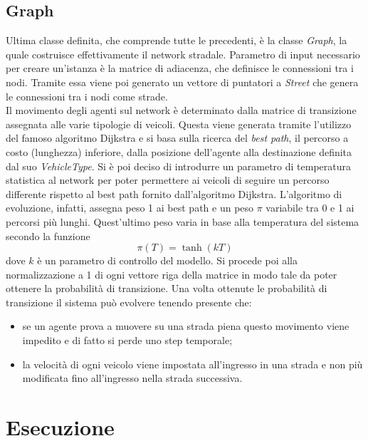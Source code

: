 \documentclass[../main.tex]{subfiles}un
\begin{document}
\subsection{Graph}
Ultima classe definita, che comprende tutte le precedenti, \`e la classe \emph{Graph}, la quale costruisce effettivamente il network stradale.
Parametro di input necessario per creare un'istanza \`e la matrice di adiacenza, che definisce le connessioni tra i nodi.
Tramite essa viene poi generato un vettore di puntatori a \emph{Street} che genera le connessioni tra i nodi come strade.\\
Il movimento degli agenti sul network \`e determinato dalla matrice di transizione assegnata alle varie tipologie di veicoli.
Questa viene generata tramite l'utilizzo del famoso algoritmo Dijkstra \cite{dijkstra} e si basa sulla ricerca del \emph{best path}, il percorso a costo (lunghezza) inferiore, dalla posizione dell'agente alla destinazione definita dal suo \emph{VehicleType}.
Si \`e poi deciso di introdurre un parametro di temperatura statistica al network per poter permettere ai veicoli di seguire un percorso differente rispetto al best path fornito dall'algoritmo Dijkstra.
L'algoritmo di evoluzione, infatti, assegna peso 1 ai best path e un peso $\pi$ variabile tra 0 e 1 ai percorsi più lunghi.
Quest'ultimo peso varia in base alla temperatura del sistema secondo la funzione
\begin{equation}
    \pi(T)=\tanh(kT)
\end{equation}
dove $k$ \`e un parametro di controllo del modello.
Si procede poi alla normalizzazione a 1 di ogni vettore riga della matrice in modo tale da poter ottenere la probabilità di transizione.
Una volta ottenute le probabilità di transizione il sistema può evolvere tenendo presente che:
\begin{itemize}
    \item se un agente prova a muovere su una strada piena questo movimento viene impedito e di fatto si perde uno step temporale;
    \item la velocità di ogni veicolo viene impostata all'ingresso in una strada e non più modificata fino all'ingresso nella strada successiva. 
\end{itemize}

\section{Esecuzione}
\end{document}
